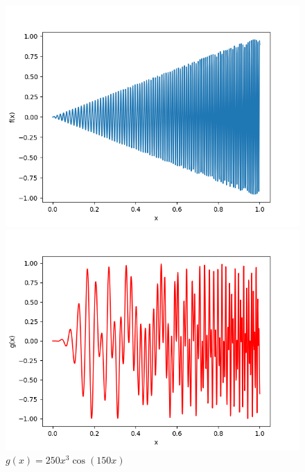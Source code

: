 \documentclass[11pt,a4paper,openright,oneside]{book}
\numberwithin{equation}{section}
\begin{document}
{\begin{figure}[H]

\begin{adjustwidth}{-30pt}{-30pt}
    \begin{minipage}[t]{0.32\linewidth}
        \centering
        \includegraphics[width=\linewidth]{media/f.png}
        \caption*{$f(x) = x\sin(200 (x+1)^2)$}
    \end{minipage}
    \begin{minipage}[t]{0.32\linewidth}
        \centering
        \includegraphics[width=\linewidth]{media/g.png}
        \caption*{$g(x)=250x^3 \cos(150x)$}
    \end{minipage}
    \begin{minipage}[t]{0.32\linewidth}

\end{minipage}
\end{adjustwidth}
\end{figure}}
\end{document}
